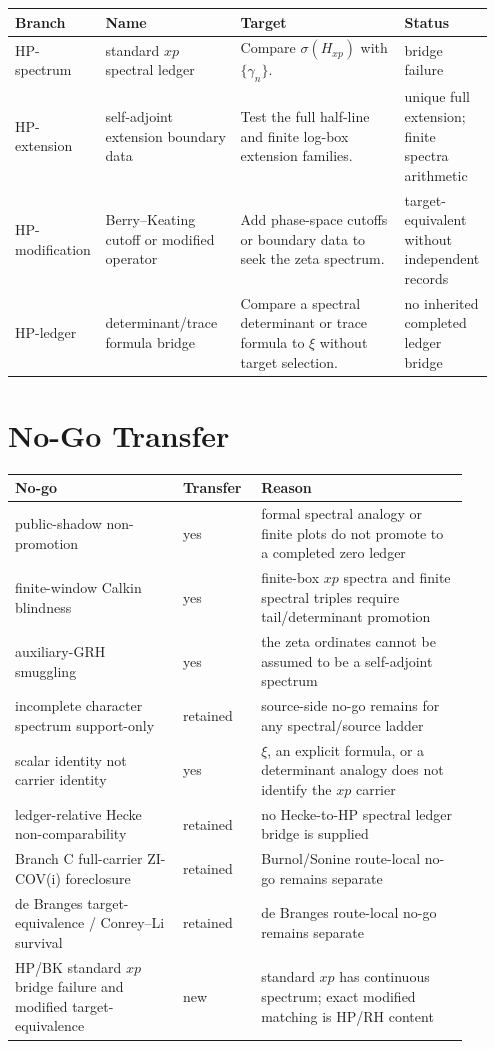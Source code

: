\documentclass[11pt]{article}
\newcommand{\Hxp}{H_{xp}}
\begin{document}
\begin{center}
\begin{tabular}{p{0.18\linewidth}p{0.28\linewidth}p{0.34\linewidth}p{0.15\linewidth}}
\toprule
Branch & Name & Target & Status\\
\midrule
HP-spectrum & standard \(xp\) spectral ledger
& Compare \(\sigma(\Hxp)\) with \(\{\gamma_n\}\).
& bridge failure\\
HP-extension & self-adjoint extension boundary data
& Test the full half-line and finite log-box extension families.
& unique full extension; finite spectra arithmetic\\
HP-modification & Berry--Keating cutoff or modified operator
& Add phase-space cutoffs or boundary data to seek the zeta spectrum.
& target-equivalent without independent records\\
HP-ledger & determinant/trace formula bridge
& Compare a spectral determinant or trace formula to \(\xi\) without target selection.
& no inherited completed ledger bridge\\
\bottomrule
\end{tabular}
\end{center}

\section*{No-Go Transfer}

\begin{center}
\begin{tabular}{p{0.34\linewidth}p{0.14\linewidth}p{0.42\linewidth}}
\toprule
No-go & Transfer & Reason\\
\midrule
public-shadow non-promotion & yes
& formal spectral analogy or finite plots do not promote to a completed zero ledger\\
finite-window Calkin blindness & yes
& finite-box \(xp\) spectra and finite spectral triples require tail/determinant promotion\\
auxiliary-GRH smuggling & yes
& the zeta ordinates cannot be assumed to be a self-adjoint spectrum\\
incomplete character spectrum support-only & retained
& source-side no-go remains for any spectral/source ladder\\
scalar identity not carrier identity & yes
& \(\xi\), an explicit formula, or a determinant analogy does not identify the \(xp\) carrier\\
ledger-relative Hecke non-comparability & retained
& no Hecke-to-HP spectral ledger bridge is supplied\\
Branch C full-carrier ZI-COV(i) foreclosure & retained
& Burnol/Sonine route-local no-go remains separate\\
de Branges target-equivalence / Conrey--Li survival & retained
& de Branges route-local no-go remains separate\\
HP/BK standard \(xp\) bridge failure and modified target-equivalence & new
& standard \(xp\) has continuous spectrum; exact modified matching is HP/RH content\\
\bottomrule
\end{tabular}
\end{center}
\end{document}

